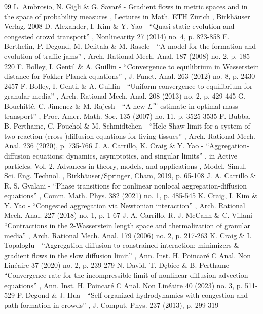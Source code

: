 \documentclass[11pt]{article}
\numberwithin{equation}{section}
\theoremstyle{plain}
\theoremstyle{remark}
\begin{document}
\begin{thebibliography}{99}
 L. Ambrosio, N. Gigli \& G. Savaré - Gradient flows in metric spaces and in the space of probability measures , Lectures in Math. ETH Zürich , Birkhäuser Verlag, 2008
 D. Alexander, I. Kim \& Y. Yao - “Quasi-static evolution and congested crowd transport” , Nonlinearity 27 (2014) no. 4, p. 823-858
 F. Berthelin, P. Degond, M. Delitala \& M. Rascle - “A model for the formation and evolution of traffic jams” , Arch. Rational Mech. Anal. 187 (2008) no. 2, p. 185-220
 F. Bolley, I. Gentil \& A. Guillin - “Convergence to equilibrium in Wasserstein distance for Fokker-Planck equations” , J. Funct. Anal. 263 (2012) no. 8, p. 2430-2457
 F. Bolley, I. Gentil \& A. Guillin - “Uniform convergence to equilibrium for granular media” , Arch. Rational Mech. Anal. 208 (2013) no. 2, p. 429-445
 G. Bouchitté, C. Jimenez \& M. Rajesh - “A new $L^\infty $ estimate in optimal mass transport” , Proc. Amer. Math. Soc. 135 (2007) no. 11, p. 3525-3535
 F. Bubba, B. Perthame, C. Pouchol \& M. Schmidtchen - “Hele-Shaw limit for a system of two reaction-(cross-)diffusion equations for living tissues” , Arch. Rational Mech. Anal. 236 (2020), p. 735-766
 J. A. Carrillo, K. Craig \& Y. Yao - “Aggregation-diffusion equations: dynamics, asymptotics, and singular limits” , in Active particles. Vol. 2. Advances in theory, models, and applications , Model. Simul. Sci. Eng. Technol. , Birkhäuser/Springer, Cham, 2019, p. 65-108
 J. A. Carrillo \& R. S. Gvalani - “Phase transitions for nonlinear nonlocal aggregation-diffusion equations” , Comm. Math. Phys. 382 (2021) no. 1, p. 485-545
 K. Craig, I. Kim \& Y. Yao - “Congested aggregation via Newtonian interaction” , Arch. Rational Mech. Anal. 227 (2018) no. 1, p. 1-67
 J. A. Carrillo, R. J. McCann \& C. Villani - “Contractions in the 2-Wasserstein length space and thermalization of granular media” , Arch. Rational Mech. Anal. 179 (2006) no. 2, p. 217-263
 K. Craig \& I. Topaloglu - “Aggregation-diffusion to constrained interaction: minimizers \& gradient flows in the slow diffusion limit” , Ann. Inst. H. Poincaré C Anal. Non Linéaire 37 (2020) no. 2, p. 239-279
 N. David, T. Dębiec \& B. Perthame - “Convergence rate for the incompressible limit of nonlinear diffusion-advection equations” , Ann. Inst. H. Poincaré C Anal. Non Linéaire 40 (2023) no. 3, p. 511-529
 P. Degond \& J. Hua - “Self-organized hydrodynamics with congestion and path formation in crowds” , J. Comput. Phys. 237 (2013), p. 299-319

\end{thebibliography}
\end{document}
